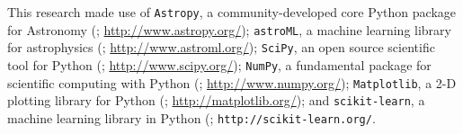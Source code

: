 \documentclass[useamsfonts]{pasj01}
\begin{document}
\begin{ack}
    This research made use of
    {\texttt{Astropy}},
        a community-developed core Python package for Astronomy (\citealt{Astropy};
        \url{http://www.astropy.org/});
    {\texttt{astroML}},
        a machine learning library for astrophysics (\citealt{astroml};
        \url{http://www.astroml.org/});
    {\texttt{SciPy}},
        an open source scientific tool for Python (\citealt{SciPy};
        \url{http://www.scipy.org/});
    {\texttt{NumPy}},
        a fundamental package for scientific computing with Python (\citealt{NumPy};
        \url{http://www.numpy.org/});
    {\texttt{Matplotlib}},
        a 2-D plotting library for Python (\citealt{Matplotlib};
        \url{http://matplotlib.org/}); and
    {\texttt{scikit-learn}},
        a machine learning library in Python (\citealt{scikit-learn};
        \texttt{http://scikit-learn.org/}.

\end{ack}


%


\end{document}
